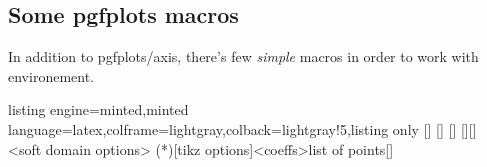 \documentclass[11pt,a4paper]{ltxdoc}
\begin{document}
\pagebreak

\subsection{Some pgfplots macros}

In addition to pgfplots/axis, there's few \textit{simple} macros in order to work with  environement.

\begin{tcblisting}{listing engine=minted,minted language=latex,colframe=lightgray,colback=lightgray!5,listing only}
[\myt]
[\myxcoord]
[\myycoord]
[\myxcoord][\myycoord]
<soft domain options>
\addplotspline(*)[tikz options]<coeffs>{list of points}[\myspline]
\end{tcblisting}
\end{document}
